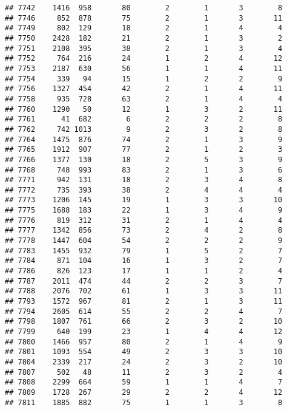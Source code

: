 \documentclass[]{article}
\begin{document}
\begin{verbatim}
## 7742    1416  958       80        2        1       3        8
## 7746     852  878       75        2        1       3       11
## 7749     802  129       18        2        1       4        4
## 7750    2428  182       21        2        1       3        2
## 7751    2108  395       38        2        1       3        4
## 7752     764  216       24        1        2       4       12
## 7753    2187  630       56        1        1       4       11
## 7754     339   94       15        1        2       2        9
## 7756    1327  454       42        2        1       4       11
## 7758     935  728       63        2        1       4        4
## 7760    1290   50       12        1        3       2       11
## 7761      41  682        6        2        2       2        8
## 7762     742 1013        9        2        3       2        8
## 7764    1475  876       74        2        1       3        9
## 7765    1912  907       77        2        1       2        3
## 7766    1377  130       18        2        5       3        9
## 7768     748  993       83        2        1       3        6
## 7771     942  131       18        2        3       4        8
## 7772     735  393       38        2        4       4        4
## 7773    1206  145       19        1        3       3       10
## 7775    1688  183       22        1        3       4        9
## 7776     819  312       31        2        1       4        4
## 7777    1342  856       73        2        4       2        8
## 7778    1447  604       54        2        2       2        9
## 7783    1455  932       79        1        5       2        7
## 7784     871  104       16        1        3       2        7
## 7786     826  123       17        1        1       2        4
## 7787    2011  474       44        2        2       3        7
## 7788    2076  702       61        1        3       3       11
## 7793    1572  967       81        2        1       3       11
## 7794    2605  614       55        2        2       4        7
## 7798    1807  761       66        2        3       2       10
## 7799     640  199       23        1        4       4       12
## 7800    1466  957       80        2        1       4        9
## 7801    1093  554       49        2        3       3       10
## 7804    2339  217       24        2        3       2       10
## 7807     502   48       11        2        3       2        4
## 7808    2299  664       59        1        1       4        7
## 7809    1728  267       29        2        2       4       12
## 7811    1885  882       75        1        1       3        8

\end{verbatim}
\end{document}
